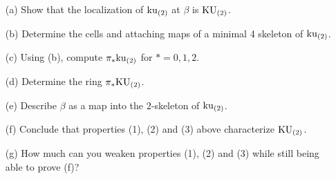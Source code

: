 \documentclass[reqno]{amsart}
\begin{document}
\begin{enumerate}
\item[(a)] Show that the localization of $\mathrm{ku}_{(2)}$ at $\beta$ is $\mathrm{KU}_{(2)}$.
\item[(b)] Determine the cells and attaching maps of a minimal 4 skeleton of $\mathrm{ku}_{(2)}$.
\item[(c)] Using (b), compute $\pi_*\mathrm{ku}_{(2)}$ for $*=0,1,2$.
\item[(d)] Determine the ring $\pi_*\mathrm{KU}_{(2)}$.
\item[(e)] Describe $\beta$ as a map into the $2$-skeleton of $\mathrm{ku}_{(2)}$.
\item[(f)] Conclude that properties (1), (2) and (3) above characterize $\mathrm{KU}_{(2)}$.
\item[(g)] How much can you weaken properties (1), (2) and (3) while still being able to prove (f)?
\end{enumerate}















\end{document}
